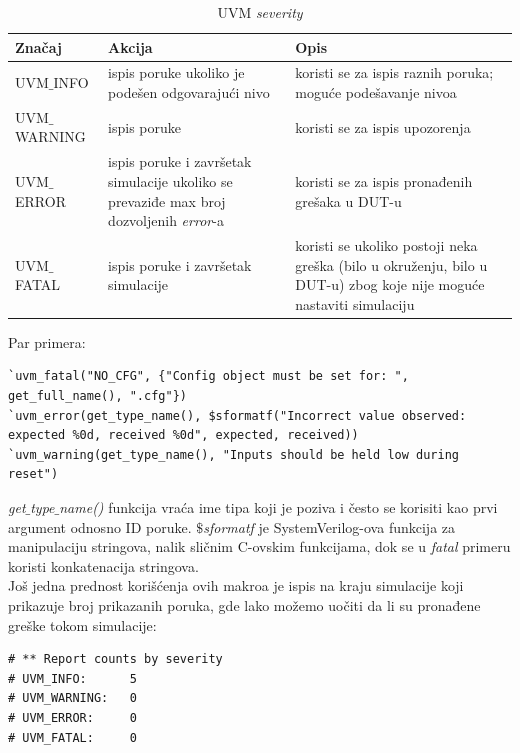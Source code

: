\begin{table}[h!]
  \centering
  \begin{tabular}{|p{}|p{}|p{}|}
    \hline
    \textbf{Značaj} & \textbf{Akcija} & \textbf{Opis}\\
    \hline
    UVM\(\_\)INFO & ispis poruke ukoliko je podešen odgovarajući nivo & koristi se za ispis raznih poruka; moguće podešavanje nivoa\\
    \hline
    UVM\(\_\)WARNING & ispis poruke & koristi se za ispis upozorenja\\
    \hline
    UVM\(\_\)ERROR & ispis poruke i završetak simulacije ukoliko se prevaziđe max broj dozvoljenih \emph{error}-a & koristi se za ispis pronađenih grešaka u DUT-u\\
    \hline
    UVM\(\_\)FATAL & ispis poruke i završetak simulacije & koristi se ukoliko postoji neka greška (bilo u okruženju, bilo u DUT-u) zbog koje nije moguće nastaviti simulaciju\\
    \hline
  \end{tabular}
  \caption{UVM \emph{severity}}
  \label{tab:uvm_severity}
\end{table}

Par primera:

\begin{lstlisting}
`uvm_fatal("NO_CFG", {"Config object must be set for: ", get_full_name(), ".cfg"})
`uvm_error(get_type_name(), $sformatf("Incorrect value observed: expected %0d, received %0d", expected, received))
`uvm_warning(get_type_name(), "Inputs should be held low during reset")
\end{lstlisting}

\emph{get\(\_\)type\(\_\)name()} funkcija vraća ime tipa koji je poziva i često
se korisiti kao prvi argument odnosno ID poruke. \emph{\(\$\)sformatf} je
SystemVerilog-ova funkcija za manipulaciju stringova, nalik sličnim C-ovskim
funkcijama, dok se u \emph{fatal} primeru koristi konkatenacija stringova.\\

Još jedna prednost korišćenja ovih makroa je ispis na kraju simulacije koji
prikazuje broj prikazanih poruka, gde lako možemo uočiti da li su pronađene
greške tokom simulacije: \\

\begin{verbatim}
# ** Report counts by severity
# UVM_INFO:      5
# UVM_WARNING:   0
# UVM_ERROR:     0
# UVM_FATAL:     0
\end{verbatim}

